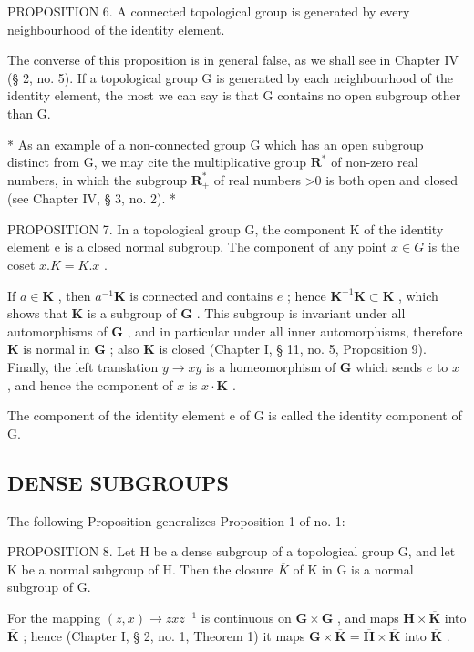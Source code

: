 PROPOSITION 6. A connected topological group is generated by every neighbourhood of the identity element.

The converse of this proposition is in general false, as we shall see in Chapter IV (§ 2, no. 5). If a topological group G is generated by each neighbourhood of the identity element, the most we can say is that G contains no open subgroup other than G.

* As an example of a non-connected group G which has an open subgroup distinct from G, we may cite the multiplicative group \(\mathbf{R}^{*}\) of non-zero real numbers, in which the subgroup \(\mathbf{R}_{+}^{*}\) of real numbers \textgreater0 is both open and closed (see Chapter IV, § 3, no. 2). *

PROPOSITION 7. In a topological group G, the component K of the identity element e is a closed normal subgroup. The component of any point \(x \in G\) is the coset \(x.K = K.x\) .

If \(a \in \mathbf{K}\) , then \(a^{-1}\mathbf{K}\) is connected and contains \(e\) ; hence \(\mathbf{K}^{-1}\mathbf{K} \subset \mathbf{K}\) , which shows that \(\mathbf{K}\) is a subgroup of \(\mathbf{G}\) . This subgroup is invariant under all automorphisms of \(\mathbf{G}\) , and in particular under all inner automorphisms, therefore \(\mathbf{K}\) is normal in \(\mathbf{G}\) ; also \(\mathbf{K}\) is closed (Chapter I, § 11, no. 5, Proposition 9). Finally, the left translation \(y \to xy\) is a homeomorphism of \(\mathbf{G}\) which sends \(e\) to \(x\) , and hence the component of \(x\) is \(x\cdot \mathbf{K}\) .

The component of the identity element e of G is called the identity component of G.

\subsection{DENSE SUBGROUPS}

The following Proposition generalizes Proposition 1 of no. 1:

PROPOSITION 8. Let H be a dense subgroup of a topological group G, and let K be a normal subgroup of H. Then the closure \(\overline{K}\) of K in G is a normal subgroup of G.

For the mapping \((z, x) \to zxz^{-1}\) is continuous on \(\mathbf{G} \times \mathbf{G}\) , and maps \(\mathbf{H} \times \overline{\mathbf{K}}\) into \(\overline{\mathbf{K}}\) ; hence (Chapter I, § 2, no. 1, Theorem 1) it maps \(\mathbf{G} \times \overline{\mathbf{K}} = \overline{\mathbf{H}} \times \overline{\mathbf{K}}\) into \(\overline{\mathbf{K}}\) .

